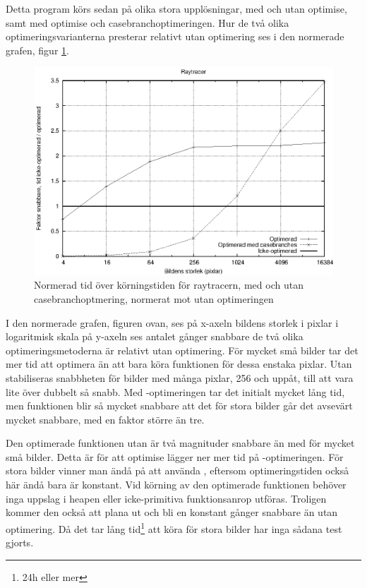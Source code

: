 \documentclass[Rapport]{subfiles}
\begin{document}
Detta program körs sedan på olika stora upplösningar, med och utan optimise,
samt med optimise och casebranchoptimeringen. Hur de två olika
optimeringsvarianterna presterar relativt utan optimering ses i 
den normerade grafen, figur \ref{fig:Resultat:shapes:normgraf}.

\begin{figure}[H]
\includegraphics{shapesnorm.eps}
\caption{Normerad tid över körningstiden för raytracern, med och utan
casebranchoptmering, normerat mot utan optimeringen}
\label{fig:Resultat:shapes:normgraf}
\end{figure}

I den normerade grafen, figuren ovan, ses
på x-axeln bildens storlek i pixlar i logaritmisk skala
på y-axeln ses antalet gånger snabbare de två olika optimeringsmetoderna är relativt
utan optimering. 
För mycket små bilder tar det mer tid att optimera än att bara köra
funktionen för dessa enstaka pixlar. Utan  stabiliseras
snabbheten för bilder med många pixlar, 256 och uppåt, till att vara lite över dubbelt
så snabb.
Med -optimeringen tar det initialt mycket lång tid, men funktionen blir
så mycket snabbare att det för stora bilder går det avsevärt mycket snabbare, med 
en faktor större än tre.

Den optimerade funktionen utan  är två magnituder snabbare
än med  för mycket små bilder. Detta är för att optimise
lägger ner mer tid på -optimeringen.
För stora bilder vinner man ändå på att använda , eftersom optimeringstiden
också här ändå bara är konstant. Vid körning av den optimerade funktionen
behöver inga uppslag i heapen eller icke-primitiva funktionsanrop utföras. 
Troligen kommer den också att plana
ut och bli en konstant gånger snabbare än utan optimering. Då det tar
lång tid\footnote{ 24h eller mer} att köra för stora bilder
har inga sådana test gjorts.
\end{document}
